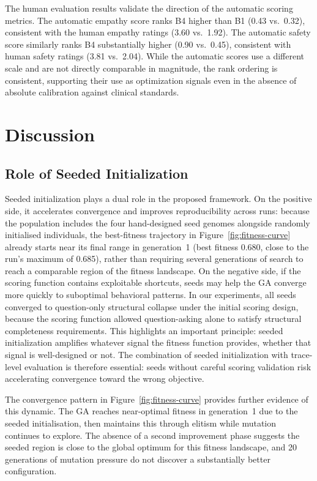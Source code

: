 \documentclass[mathematics,article,xetex,moreauthors]{Definitions/mdpi}
\begin{document}
The human evaluation results validate the direction of the automatic
scoring metrics. The automatic empathy score ranks B4 higher than B1
(0.43 vs.\ 0.32), consistent with the human empathy ratings
(3.60 vs.\ 1.92). The automatic safety score similarly ranks B4
substantially higher (0.90 vs.\ 0.45), consistent with human safety
ratings (3.81 vs.\ 2.04). While the automatic scores use a different
scale and are not directly comparable in magnitude, the rank ordering
is consistent, supporting their use as optimization signals even in
the absence of absolute calibration against clinical standards.

\section{Discussion}
\label{sec:discussion}

\subsection{Role of Seeded Initialization}

Seeded initialization plays a dual role in the proposed framework. On the
positive side, it accelerates convergence and improves reproducibility
across runs: because the population includes the four hand-designed seed
genomes alongside randomly initialised individuals, the best-fitness
trajectory in Figure~\ref{fig:fitness-curve} already starts near its final
range in generation~1 (best fitness 0.680, close to the run's maximum of
0.685), rather than requiring several generations of search to reach a
comparable region of the fitness landscape. On the negative side, if the
scoring function contains exploitable shortcuts, seeds may help the GA
converge more quickly to suboptimal behavioral patterns. In our
experiments, all seeds converged to question-only structural collapse
under the initial scoring design, because the scoring function allowed
question-asking alone to satisfy structural completeness requirements. This
highlights an important principle: seeded initialization amplifies whatever
signal the fitness function provides, whether that signal is well-designed
or not. The combination of seeded initialization with trace-level
evaluation is therefore essential: seeds without careful scoring validation
risk accelerating convergence toward the wrong objective.

The convergence pattern in Figure~\ref{fig:fitness-curve} provides further
evidence of this dynamic. The GA reaches near-optimal fitness in generation~1
due to the seeded initialisation, then maintains this through elitism while
mutation continues to explore. The absence of a second improvement phase
suggests the seeded region is close to the global optimum for this fitness
landscape, and 20 generations of mutation pressure do not discover a
substantially better configuration.
\end{document}
